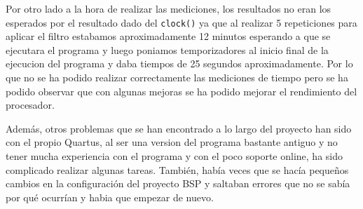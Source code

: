 \documentclass[11pt]{report}
\begin{document}
Por otro lado a la hora de realizar las mediciones, los resultados no eran los esperados por el resultado dado del \texttt{clock()} ya que al realizar 5 repeticiones
para aplicar el filtro estabamos aproximadamente 12 minutos esperando a que se ejecutara el programa y luego poniamos temporizadores al inicio final de la ejecucion del
programa y daba tiempos de 25 segundos aproximadamente. Por lo que no se ha podido realizar correctamente las mediciones de tiempo pero se ha podido observar
que con algunas mejoras se ha podido mejorar el rendimiento del procesador.

Además, otros problemas que se han encontrado a lo largo del proyecto han sido con el propio Quartus, al ser una version del programa bastante antiguo y
no tener mucha experiencia con el programa y con el poco soporte online, ha sido complicado realizar algunas tareas. También, había veces que se hacía
pequeños cambios en la configuración del proyecto BSP y saltaban errores que no se sabía por qué ocurrían y habia que empezar de nuevo. 
\end{document}
